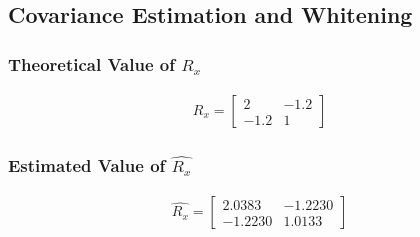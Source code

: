 \documentclass{article}
\begin{document}
\pagebreak

	\subsection{Covariance Estimation and Whitening}
		\subsubsection{Theoretical Value of $R_{x}$}
			\begin{align*}
				R_{x} =
				\begin{bmatrix}
					2 & -1.2 \\
					-1.2 & 1
				\end{bmatrix}
			\end{align*}
		\subsubsection{Estimated Value of $\hat{R_{x}}$}
			\begin{align*}
				\hat{R_{x}} =
				\begin{bmatrix}
					2.0383 & -1.2230 \\
					-1.2230 & 1.0133
				\end{bmatrix}
			\end{align*}
\end{document}
